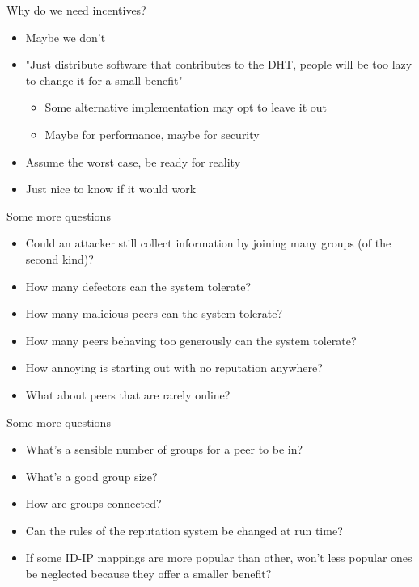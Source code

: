 \documentclass[presentation,english,usenames,dvipsnames]{beamer}
\begin{document}
\begin{frame}
\end{frame}

\begin{frame}{Why do we need incentives?}
  \begin{itemize}
    \item Maybe we don't
    \item "Just distribute software that contributes to the DHT, people will be
          too lazy to change it for a small benefit"
          \begin{itemize}
            \item Some alternative implementation may opt to leave it out
            \item Maybe for performance, maybe for security
          \end{itemize}
    \item Assume the worst case, be ready for reality
    \item Just nice to know if it would work
  \end{itemize}
\end{frame}

\begin{frame}{Some more questions}
  \begin{itemize}
    \item Could an attacker still collect information by joining many groups (of
          the second kind)?
    \item How many defectors can the system tolerate?
    \item How many malicious peers can the system tolerate?
    \item How many peers behaving too generously can the system tolerate?
    \item How annoying is starting out with no reputation anywhere?
    \item What about peers that are rarely online?
  \end{itemize}
\end{frame}

\begin{frame}{Some more questions}
  \begin{itemize}
    \item What's a sensible number of groups for a peer to be in?
    \item What's a good group size?
    \item How are groups connected?
    \item Can the rules of the reputation system be changed at run time?
    \item If some ID-IP mappings are more popular than other, won't less popular
          ones be neglected because they offer a smaller benefit?
  \end{itemize}
\end{frame}
\end{document}
